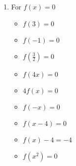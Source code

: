 \begin{enumerate}
\begin{multicols}{3}
\begin{itemize}
\item  $f(x-4) = 6$ 

\item $f(x) - 4 = 2$
     
\item  $f\left(x^2\right) = 6$

\end{itemize}
\end{multicols}



\item For $f(x) = 0$ 

\begin{multicols}{3}
\begin{itemize}
\item $f(3) = 0$
\item $f(-1) =0$
\item $f\left(\frac{3}{2} \right) = 0$
\end{itemize}
\end{multicols}

\begin{multicols}{3}
\begin{itemize}
\item  $f(4x) = 0$
\item $4f(x) = 0$
\item $f(-x) = 0$
\end{itemize}
\end{multicols}

\begin{multicols}{3}
\begin{itemize}

\item  $f(x-4) = 0$ 

\item $f(x) - 4 = -4$
     
\item  $f\left(x^2\right) = 0$

\end{itemize}
\end{multicols}

\setcounter{HW}{\value{enumi}}
\end{enumerate}





